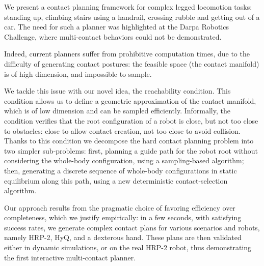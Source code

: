 We present a contact planning framework for complex legged locomotion tasks: standing up, climbing stairs using a handrail, crossing rubble and getting out of a car. The need for such a planner was highlighted at the Darpa Robotics Challenge, where multi-contact behaviors
could not be demonstrated.

Indeed, current planners suffer from prohibitive computation times, due to the difficulty
of generating contact postures: the feasible space (the contact manifold) is of high dimension,
and impossible to sample.

We tackle this issue with our novel  idea, the reachability condition. This condition allows us to define
a geometric approximation of the contact manifold, which is of low dimension and can be sampled efficiently.
Informally, the condition verifies that the root configuration of a robot is close, but not too close to obstacles: close to allow contact creation, not too close to avoid collision. Thanks to this condition we decompose the hard contact planning problem into two
simpler sub-problems: first, planning a guide path for the robot root without considering the whole-body configuration, using a sampling-based algorithm; then, generating a discrete sequence of whole-body configurations in static equilibrium along this path, using a new deterministic
contact-selection algorithm. 

Our approach results from the pragmatic choice of favoring efficiency over completeness, which we justify empirically: in a
few seconds, with satisfying success rates, we generate complex contact plans for various scenarios and robots, namely
HRP-2, HyQ, and a dexterous hand. These plans are then validated either in dynamic simulations, or on the real HRP-2 robot, thus demonstrating 
the first interactive multi-contact planner.
